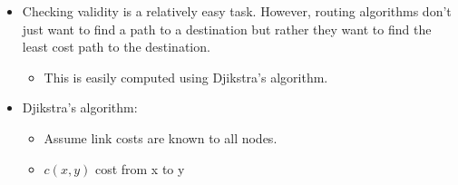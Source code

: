 \begin{itemize}
\tightlist
\item
  Checking validity is a relatively easy task. However, routing
  algorithms don't just want to find a path to a destination but rather
  they want to find the least cost path to the destination.

  \begin{itemize}
  \tightlist
  \item
    This is easily computed using Djikstra's algorithm.
  \end{itemize}
\item
  Djikstra's algorithm:

  \begin{itemize}
  \tightlist
  \item
    Assume link costs are known to all nodes.
  \item
    \(c(x,y)\) cost from x to y
  \end{itemize}

\begin{Shaded}
\begin{Highlighting}[]
\OperatorTok{=}
\OperatorTok{=} \NormalTok{()}
\NormalTok{, }\NormalTok{)}
\OperatorTok{=} \NormalTok{()}
\OperatorTok{=} \NormalTok{()}
     
\OperatorTok{=}
         
\OperatorTok{=}
\OperatorTok{=}
                 
\OperatorTok{+}
\end{Highlighting}
\end{Shaded}


\end{itemize}
